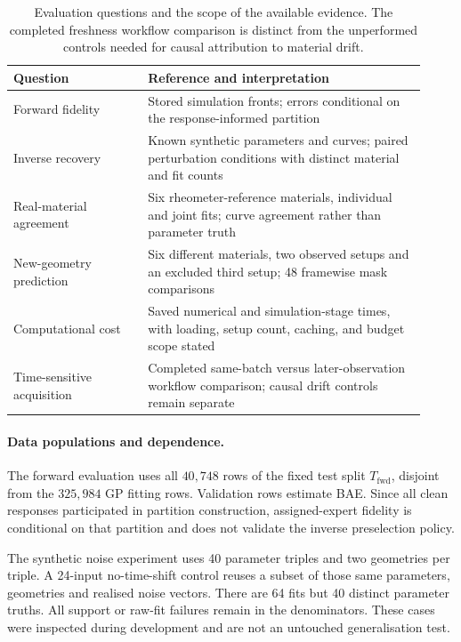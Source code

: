 \begin{table}[!htbp]
\centering\footnotesize
\setlength{\tabcolsep}{4pt}
\caption{Evaluation questions and the scope of the available evidence.
The completed freshness workflow comparison is distinct from the
unperformed controls needed for causal attribution to material drift.}
\label{tab:evaluation-scope}
\begin{tabular}{@{}p{0.30\linewidth}p{0.62\linewidth}@{}}
\toprule
Question & Reference and interpretation \\
\midrule
Forward fidelity & Stored simulation fronts; errors conditional on
the response-informed partition \\
Inverse recovery & Known synthetic parameters and curves;
paired perturbation conditions with distinct material and fit counts \\
Real-material agreement & Six rheometer-reference materials,
individual and joint fits; curve agreement rather than parameter truth \\
New-geometry prediction & Six different materials, two observed
setups and an excluded third setup; 48 framewise mask comparisons \\
Computational cost & Saved numerical and simulation-stage times,
with loading, setup count, caching, and budget scope stated \\
Time-sensitive acquisition & Completed same-batch versus later-observation
workflow comparison; causal drift controls remain separate \\
\bottomrule
\end{tabular}
\end{table}

\paragraph{Data populations and dependence.}
The forward evaluation uses all $40{,}748$ rows of the fixed test
split $T_{\mathrm{fwd}}$, disjoint from the $325{,}984$ GP fitting rows.
Validation rows estimate BAE. Since all clean responses participated
in partition construction, assigned-expert fidelity is conditional on
that partition and does not validate the inverse preselection policy.

The synthetic noise experiment uses 40 parameter triples and two
geometries per triple. A 24-input no-time-shift control reuses a subset
of those same parameters, geometries and realised noise vectors.
There are 64 fits but 40 distinct parameter truths. All support or
raw-fit failures remain in the denominators. These cases were inspected
during development and are not an untouched generalisation test.

